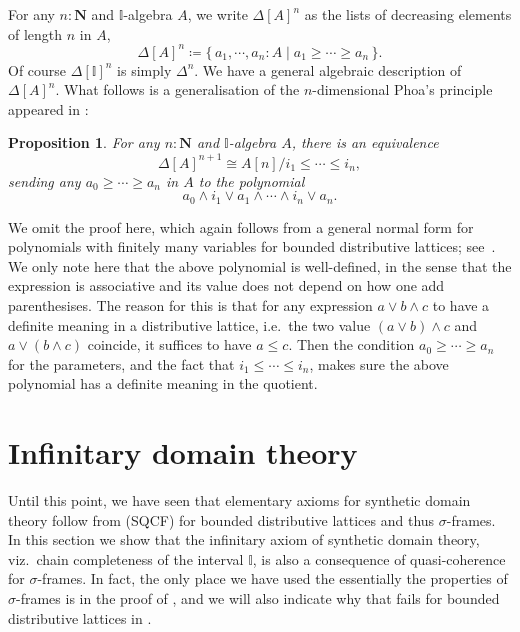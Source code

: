 \documentclass[a4paper,12pt]{amsart}
\newtheorem{proposition}[theorem]{Proposition}
\theoremstyle{definition}
\newcommand{\mb}[1]{\mathbf{#1}}
\newcommand{\mbb}[1]{\mathbb{#1}}
\newcommand{\I}{\mbb I}
\newcommand{\scomp}[2]{\{\,#1\mid#2\,\}}
\newcommand{\N}{\mb N}
\begin{document}
For any $n : \N$ and $\I$-algebra $A$, we write $\Delta[A]^{n}$ as the lists of decreasing elements of length $n$ in $A$,
\[ \Delta[A]^{n} \coloneq \scomp{a_1,\cdots,a_n : A}{a_1 \ge \cdots \ge a_n}. \]
Of course $\Delta[\I]^n$ is simply $\Delta^n$. We have a general algebraic description of $\Delta[A]^n$. What follows is a generalisation of the $n$-dimensional Phoa's principle appeared in \citet{pugh2025partialmapclassifiersierpinski}:

\begin{proposition}\label{prop:simplicesasalgebra}
  For any $n : \N$ and $\I$-algebra $A$, there is an equivalence 
  \[ \Delta[A]^{n+1} \cong A[n]/i_1 \le \cdots \le i_n, \]
  sending any $a_0 \ge \cdots \ge a_n$ in $A$ to the polynomial 
  \[ a_0 \wedge i_1 \vee a_1 \wedge \cdots \wedge i_n \vee a_n. \]
\end{proposition}

We omit the proof here, which again follows from a general normal form for polynomials with finitely many variables for bounded distributive lattices; see~\cite[Thm.\ 10.21]{lausch2000algebra}. We only note here that the above polynomial is well-defined, in the sense that the expression is associative and its value does not depend on how one add parenthesises. The reason for this is that for any expression $a \vee b \wedge c$ to have a definite meaning in a distributive lattice, i.e.\ the two value $(a \vee b) \wedge c$ and $a \vee (b \wedge c)$ coincide, it suffices to have $a \le c$. Then the condition $a_0 \ge \cdots \ge a_n$ for the parameters, and the fact that $i_1 \le \cdots \le i_n$, makes sure the above polynomial has a definite meaning in the quotient.

\section{Infinitary domain theory}\label{sec:infdomain}

Until this point, we have seen that elementary axioms for synthetic domain theory follow from (SQCF) for bounded distributive lattices and thus $\sigma$-frames. In this section we show that the infinitary axiom of synthetic domain theory, viz.\ chain completeness of the interval $\I$, is also a consequence of quasi-coherence for $\sigma$-frames. In fact, the only place we have used the essentially the properties of $\sigma$-frames is in the proof of , and we will also indicate why that fails for bounded distributive lattices in .
\end{document}
